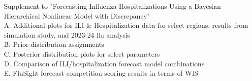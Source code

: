 \documentclass[ba]{imsart}
\theoremstyle{plain}
\theoremstyle{definition}
\theoremstyle{remark}
\begin{document}
% 
% 

\begin{supplement}
Supplement to "Forecasting Influenza Hospitalizations Using a
Bayesian Hierarchical Nonlinear Model with
Discrepancy"\\
A. Additional plots for ILI \& Hospitalization data for select regions, results 
from simulation study, and 2023-24 flu analysis\\
B. Prior distribution assignments\\
C. Posterior distribution plots for select parameters\\
D. Comparison of ILI/hospitalization forecast model combinations\\
E. FluSight forecast competition scoring results in terms of WIS
\end{supplement}




\end{document}
